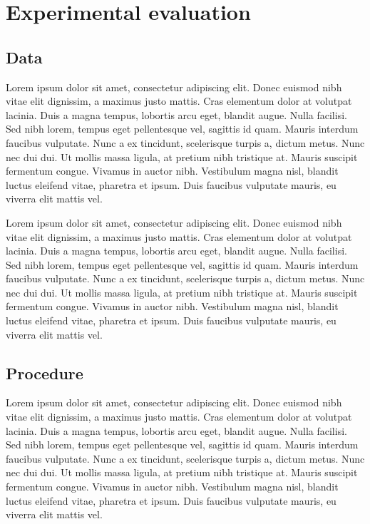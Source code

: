 \documentclass{article}
\begin{document}
\section{Experimental evaluation}



\subsection{Data}
Lorem ipsum dolor sit amet, consectetur adipiscing elit.
Donec euismod nibh vitae elit dignissim, a maximus justo mattis.
Cras elementum dolor at volutpat lacinia.
Duis a magna tempus, lobortis arcu eget, blandit augue.
Nulla facilisi.
Sed nibh lorem, tempus eget pellentesque vel, sagittis id quam.
Mauris interdum faucibus vulputate.
Nunc a ex tincidunt, scelerisque turpis a, dictum metus.
Nunc nec dui dui.
Ut mollis massa ligula, at pretium nibh tristique at.
Mauris suscipit fermentum congue.
Vivamus in auctor nibh.
Vestibulum magna nisl, blandit luctus eleifend vitae, pharetra et ipsum.
Duis faucibus vulputate mauris, eu viverra elit mattis vel.

Lorem ipsum dolor sit amet, consectetur adipiscing elit.
Donec euismod nibh vitae elit dignissim, a maximus justo mattis.
Cras elementum dolor at volutpat lacinia.
Duis a magna tempus, lobortis arcu eget, blandit augue.
Nulla facilisi.
Sed nibh lorem, tempus eget pellentesque vel, sagittis id quam.
Mauris interdum faucibus vulputate.
Nunc a ex tincidunt, scelerisque turpis a, dictum metus.
Nunc nec dui dui.
Ut mollis massa ligula, at pretium nibh tristique at.
Mauris suscipit fermentum congue.
Vivamus in auctor nibh.
Vestibulum magna nisl, blandit luctus eleifend vitae, pharetra et ipsum.
Duis faucibus vulputate mauris, eu viverra elit mattis vel.



\subsection{Procedure}
Lorem ipsum dolor sit amet, consectetur adipiscing elit.
Donec euismod nibh vitae elit dignissim, a maximus justo mattis.
Cras elementum dolor at volutpat lacinia.
Duis a magna tempus, lobortis arcu eget, blandit augue.
Nulla facilisi.
Sed nibh lorem, tempus eget pellentesque vel, sagittis id quam.
Mauris interdum faucibus vulputate.
Nunc a ex tincidunt, scelerisque turpis a, dictum metus.
Nunc nec dui dui.
Ut mollis massa ligula, at pretium nibh tristique at.
Mauris suscipit fermentum congue.
Vivamus in auctor nibh.
Vestibulum magna nisl, blandit luctus eleifend vitae, pharetra et ipsum.
Duis faucibus vulputate mauris, eu viverra elit mattis vel.
\end{document}
